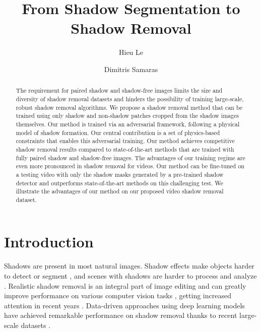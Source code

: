 \documentclass[runningheads]{llncs}
\begin{document}
\pagestyle{headings}
\mainmatter
\def\ECCVSubNumber{1321}  

\title{From Shadow Segmentation to Shadow Removal} 



\author{Hieu Le \and
Dimitris Samaras }
\maketitle




\begin{abstract}
The requirement for paired shadow and shadow-free images limits the size and diversity of shadow removal datasets and hinders the possibility of training large-scale, robust shadow removal algorithms. We propose a shadow removal method that can be trained using only shadow and non-shadow patches cropped from the shadow images themselves. Our method is trained via an adversarial framework, following a physical model of shadow formation. Our central contribution is a set of physics-based constraints that enables this adversarial training. Our method achieves competitive shadow removal results compared to state-of-the-art methods that are trained with fully paired shadow and shadow-free images. The advantages of our training regime are even more pronounced in shadow removal for videos. Our method can be fine-tuned on a testing video with only the shadow masks generated by a pre-trained shadow detector and outperforms state-of-the-art methods on this challenging test. We illustrate the advantages of our method on our proposed video shadow removal dataset. 
\end{abstract}


\section{Introduction}

Shadows are present in most natural images. Shadow effects make objects harder to detect or segment \cite{m_Le-etal-ECCV18}, and scenes with shadows are harder to process and analyze \cite{Le_2019_CVPR_Workshops}. Realistic shadow removal is an integral part of image editing \cite{Chuang2003} and can greatly improve performance on various computer vision tasks  \cite{Mller2019BrightnessCA,Su2016ShadowDA,Zhang2019ImprovingSS,LeICCV2017,Le2016GeodesicDH}, getting increased attention in recent years \cite{Qu_2017_CVPR,guo11,Gong16}.  Data-driven approaches using deep learning models have achieved remarkable performance on shadow removal \cite{Ding2019ARGANAR,Le-etal-ICCV19,Hu_2018_CVPR,hu_iccv2019mask,Wang_2018_CVPR,Zhang:AAA2020} thanks to  recent large-scale datasets \cite{Vicente-etal-ECCV16,Wang_2018_CVPR}. 
\end{document}

